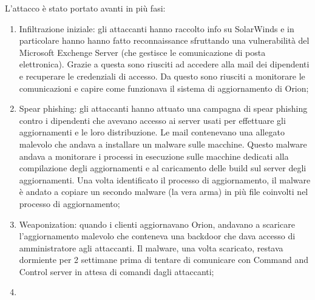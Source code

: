 \noindent L'attacco è stato portato avanti in più fasi:
\begin{enumerate}
    \item Infiltrazione iniziale: gli attaccanti hanno raccolto info su SolarWinds e in particolare hanno hanno fatto reconnaissance sfruttando una vulnerabilità del Microsoft Exchenge Server (che gestisce le comunicazione di posta elettronica). Grazie a questa sono riusciti ad accedere alla mail dei dipendenti e recuperare le credenziali di accesso. Da questo sono riusciti a monitorare le comunicazioni e capire come funzionava il sistema di aggiornamento di Orion;
    \item Spear phishing: gli attaccanti hanno attuato una campagna di spear phishing contro i dipendenti che avevano accesso ai server usati per effettuare gli aggiornamenti e le loro distribuzione. Le mail contenevano una allegato malevolo che andava a installare un malware sulle macchine. Questo malware andava a monitorare i processi in esecuzione sulle macchine dedicati alla compilazione degli aggiornamenti e al caricamento delle build sul server degli aggiornamenti. Una volta identificato il processo di aggiornamento, il malware è andato a copiare un secondo malware (la vera arma) in più file coinvolti nel processo di aggiornamento;
    \item Weaponization: quando i clienti aggiornavano Orion, andavano a scaricare l'aggiornamento malevolo che conteneva una backdoor che dava accesso di amministratore agli attaccanti. Il malware, una volta scaricato, restava dormiente per 2 settimane prima di tentare di comunicare con Command and Control server in attesa di comandi dagli attaccanti;
    \item 
\end{enumerate}









